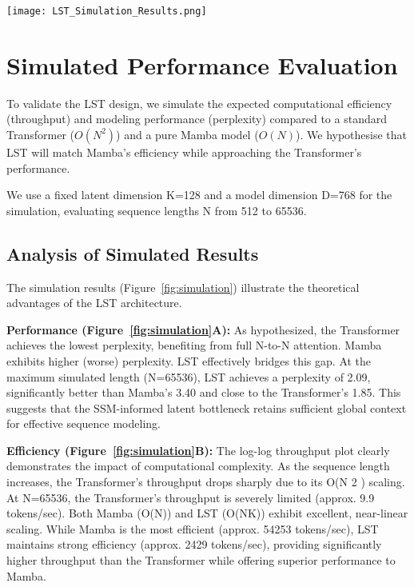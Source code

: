 \documentclass[10pt,twocolumn,letterpaper]{article}
\begin{document}
\begin{figure*}[t]
\centering
\texttt{[image: LST\_Simulation\_Results.png]}
\caption{Simulated trade‑off between perplexity (lower is better) and throughput (tokens/s, log‑log scale) as sequence length grows. LST approaches Transformer‑level perplexity while retaining the near‑linear efficiency of Mamba.}
\label{fig:simulation}
\end{figure*}

\section{Simulated Performance Evaluation}

To validate the LST design, we simulate the expected computational efficiency (throughput) and modeling performance (perplexity) compared to a standard Transformer (\(O(N^{2})\)) and a pure Mamba model (\(O(N)\)). We hypothesise that LST will match Mamba's efficiency while approaching the Transformer's performance.

We use a fixed latent dimension K=128 and a model dimension D=768 for the simulation, evaluating sequence lengths N from 512 to 65536.

\subsection{Analysis of Simulated Results}

The simulation results (Figure~\ref{fig:simulation}) illustrate the theoretical advantages of the LST architecture.

\textbf{Performance (Figure~\ref{fig:simulation}A):} As hypothesized, the Transformer achieves the lowest perplexity, benefiting from full N-to-N attention. Mamba exhibits higher (worse) perplexity. LST effectively bridges this gap. At the maximum simulated length (N=65536), LST achieves a perplexity of 2.09, significantly better than Mamba's 3.40 and close to the Transformer's 1.85. This suggests that the SSM-informed latent bottleneck retains sufficient global context for effective sequence modeling.

\textbf{Efficiency (Figure~\ref{fig:simulation}B):} The log-log throughput plot clearly demonstrates the impact of computational complexity. As the sequence length increases, the Transformer's throughput drops sharply due to its O(N 
2
 ) scaling. At N=65536, the Transformer's throughput is severely limited (approx. 9.9 tokens/sec). Both Mamba (O(N)) and LST (O(NK)) exhibit excellent, near-linear scaling. While Mamba is the most efficient (approx. 54253 tokens/sec), LST maintains strong efficiency (approx. 2429 tokens/sec), providing significantly higher throughput than the Transformer while offering superior performance to Mamba.
\end{document}
